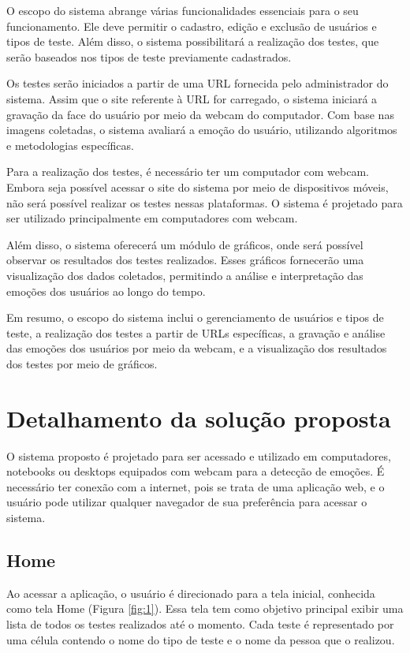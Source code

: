 O escopo do sistema abrange várias funcionalidades essenciais para o seu funcionamento. Ele deve permitir o cadastro, edição e exclusão de usuários e tipos de teste. Além disso, o sistema possibilitará a realização dos testes, que serão baseados nos tipos de teste previamente cadastrados.

Os testes serão iniciados a partir de uma URL fornecida pelo administrador do sistema. Assim que o site referente à URL for carregado, o sistema iniciará a gravação da face do usuário por meio da webcam do computador. Com base nas imagens coletadas, o sistema avaliará a emoção do usuário, utilizando algoritmos e metodologias específicas.

Para a realização dos testes, é necessário ter um computador com webcam. Embora seja possível acessar o site do sistema por meio de dispositivos móveis, não será possível realizar os testes nessas plataformas. O sistema é projetado para ser utilizado principalmente em computadores com webcam.

Além disso, o sistema oferecerá um módulo de gráficos, onde será possível observar os resultados dos testes realizados. Esses gráficos fornecerão uma visualização dos dados coletados, permitindo a análise e interpretação das emoções dos usuários ao longo do tempo.

Em resumo, o escopo do sistema inclui o gerenciamento de usuários e tipos de teste, a realização dos testes a partir de URLs específicas, a gravação e análise das emoções dos usuários por meio da webcam, e a visualização dos resultados dos testes por meio de gráficos.

\section{Detalhamento da solução proposta}

O sistema proposto é projetado para ser acessado e utilizado em computadores, notebooks ou desktops equipados com webcam para a detecção de emoções. É necessário ter conexão com a internet, pois se trata de uma aplicação web, e o usuário pode utilizar qualquer navegador de sua preferência para acessar o sistema.

\subsection{Home}

Ao acessar a aplicação, o usuário é direcionado para a tela inicial, conhecida como tela Home (Figura \ref{fig:1}). Essa tela tem como objetivo principal exibir uma lista de todos os testes realizados até o momento. Cada teste é representado por uma célula contendo o nome do tipo de teste e o nome da pessoa que o realizou.

